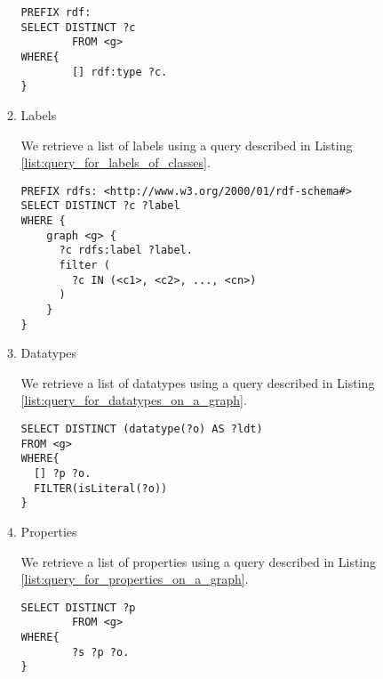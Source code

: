 \documentclass[11pt,a4paper]{article}
\begin{document}
\begin{itemize}
\begin{enumerate}
    \begin{lstlisting}[basicstyle=\ttfamily\footnotesize,breaklines=true,frame=single,caption=Obtain the classes having instances on a graph g,label=list:query_for_classes_having_instances_on_a_graph]
PREFIX rdf:
SELECT DISTINCT ?c
        FROM <g>
WHERE{
        [] rdf:type ?c.
}
    \end{lstlisting}

    \item Labels

    We retrieve a list of labels using a query described in Listing \ref{list:query_for_labels_of_classes}.

    \begin{lstlisting}[basicstyle=\ttfamily\footnotesize,breaklines=true,frame=single,caption=Obtain labels of the classes c1 c2 ... cn from a graph g,label=list:query_for_labels_of_classes]
PREFIX rdfs: <http://www.w3.org/2000/01/rdf-schema#>
SELECT DISTINCT ?c ?label
WHERE {
    graph <g> {
      ?c rdfs:label ?label.
      filter (
        ?c IN (<c1>, <c2>, ..., <cn>)
      )
    }
}
    \end{lstlisting}

    \item Datatypes

    We retrieve a list of datatypes using a query described in Listing \ref{list:query_for_datatypes_on_a_graph}.

    \begin{lstlisting}[basicstyle=\ttfamily\footnotesize,breaklines=true,frame=single,caption=Obtain the datatypes on a graph g,label=list:query_for_datatypes_on_a_graph]
SELECT DISTINCT (datatype(?o) AS ?ldt)
FROM <g>
WHERE{
  [] ?p ?o.
  FILTER(isLiteral(?o))
}
    \end{lstlisting}

    \item Properties

    We retrieve a list of properties using a query described in Listing \ref{list:query_for_properties_on_a_graph}.

    \begin{lstlisting}[basicstyle=\ttfamily\footnotesize,breaklines=true,frame=single,caption=Obtain the properties on a graph g,label=list:query_for_properties_on_a_graph]
SELECT DISTINCT ?p
        FROM <g>
WHERE{
        ?s ?p ?o.
}
    \end{lstlisting}

  \end{enumerate}


\end{itemize}
\end{document}
